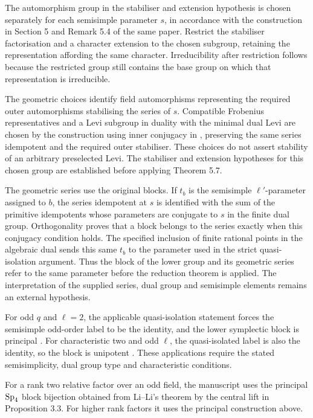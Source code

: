 The automorphism group in the stabiliser and extension hypothesis is chosen
separately for each semisimple parameter $s$, in accordance with the
construction in Section 5 and Remark 5.4 of the same paper. Restrict the
stabiliser factorisation and a character extension to the chosen subgroup,
retaining the representation affording the same character. Irreducibility
after restriction follows because the restricted group still contains the
base group on which that representation is irreducible.

The geometric choices identify field automorphisms representing the required
outer automorphisms stabilising the series of $s$. Compatible Frobenius
representatives and a Levi subgroup in duality with the minimal dual Levi
are chosen by the construction using inner conjugacy in
\cite[Corollary~4.2, Lemma~4.5 and Proposition~4.6]{Ruhstorfer2022Derived},
preserving the same series idempotent and the required outer stabiliser.
These choices do not assert stability of an arbitrary preselected Levi.
The stabiliser and extension hypotheses for this chosen group are
established before applying Theorem 5.7.

The geometric series use the original blocks. If $t_b$ is the
semisimple $\ell'$-parameter assigned to $b$, the series idempotent at $s$
is identified with the sum of the primitive idempotents whose parameters are
conjugate to $s$ in the finite dual group. Orthogonality proves that a block
belongs to the series exactly when this conjugacy condition holds. The
specified inclusion of finite rational points in the algebraic dual
sends this same $t_b$ to the parameter used in the strict quasi-isolation
argument. Thus the block of the lower group and its geometric series refer
to the same parameter before the reduction theorem is applied. The
interpretation of the supplied series, dual group and semisimple elements
remains an external hypothesis.

For odd $q$ and $\ell=2$, the applicable quasi-isolation statement forces the
semisimple odd-order label to be the identity, and the lower symplectic
block is principal \cite[Proposition~4.11(a)]{Bonnafe2005}.
For characteristic two and odd $\ell$, the quasi-isolated label is also
the identity, so the block is unipotent \cite[Example~4.8]{Bonnafe2005}. These applications
require the stated semisimplicity, dual group type and characteristic
conditions.

For a rank two relative factor over an odd field, the manuscript uses
the principal $\operatorname{Sp}_4$ block bijection obtained from Li--Li's theorem by
the central lift in Proposition 3.3. For higher rank factors
it uses the principal construction above.

